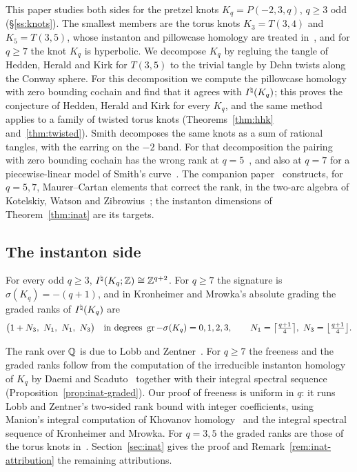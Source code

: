 This paper studies both sides for the pretzel knots $K_q=P(-2,3,q)$, $q\ge3$ odd (\S\ref{ss:knots}). The
smallest members are the torus knots $K_3=T(3,4)$ and $K_5=T(3,5)$, whose instanton and pillowcase
homology are treated in~\cite{WuebbenI,WuebbenIV,WuebbenV}, and for $q\ge7$ the knot $K_q$ is
hyperbolic. We decompose $K_q$ by regluing the tangle of Hedden, Herald and Kirk for $T(3,5)$ to the
trivial tangle by Dehn twists along the Conway sphere. For this decomposition we compute the pillowcase
homology with zero bounding cochain and find that it agrees with $I^{\natural}(K_q)$; this proves the conjecture of
Hedden, Herald and Kirk for every $K_q$, and the same method applies to a family of twisted torus knots
(Theorems~\ref{thm:hhk} and~\ref{thm:twisted}). Smith decomposes the same knots as a sum of rational tangles,
with the earring on the $-2$ band. For that decomposition the pairing with zero bounding cochain has the wrong
rank at $q=5$~\cite[proof of Thm.~5.9]{Smith}, and also at $q=7$ for a piecewise-linear model of Smith's
curve~\cite{WuebbenIIb}. The companion paper~\cite{WuebbenIIb} constructs, for $q=5,7$, Maurer--Cartan elements
that correct the rank, in the two-arc algebra of Kotelskiy, Watson and Zibrowius~\cite{KWZ}; the instanton
dimensions of Theorem~\ref{thm:inat} are its targets.

\subsection{The instanton side}
\begin{theorem}\label{thm:inat}
For every odd $q\ge3$, $I^{\natural}(K_q;\mathbb{Z})\cong\mathbb{Z}^{q+2}$. For $q\ge7$ the signature is $\sigma(K_q)=-(q+1)$,
and in Kronheimer and Mrowka's absolute grading the graded ranks of $I^{\natural}(K_q)$ are
\[
\bigl(1+N_3,\ N_1,\ N_1,\ N_3\bigr)\quad\text{in degrees }\gr-\sigma(K_q)=0,1,2,3,\qquad
N_1=\bigl\lceil\tfrac{q+1}4\bigr\rceil,\ N_3=\bigl\lfloor\tfrac{q+1}4\bigr\rfloor .
\]
\end{theorem}

The rank over $\mathbb{Q}$ is due to Lobb and Zentner~\cite[Prop.~4.7]{LZ}. For $q\ge7$ the freeness and the
graded ranks follow from the computation of the irreducible instanton homology of $K_q$ by Daemi and
Scaduto~\cite[Prop.~8.30]{DS24} together with their integral spectral sequence
(Proposition~\ref{prop:inat-graded}). Our proof of freeness is uniform in $q$: it runs Lobb and
Zentner's two-sided rank bound with integer coefficients, using Manion's integral computation of Khovanov
homology~\cite{Manion} and the integral spectral sequence of Kronheimer and Mrowka. For $q=3,5$ the
graded ranks are those of the torus knots in~\cite{WuebbenV}. Section~\ref{sec:inat} gives the proof and
Remark~\ref{rem:inat-attribution} the remaining attributions.

